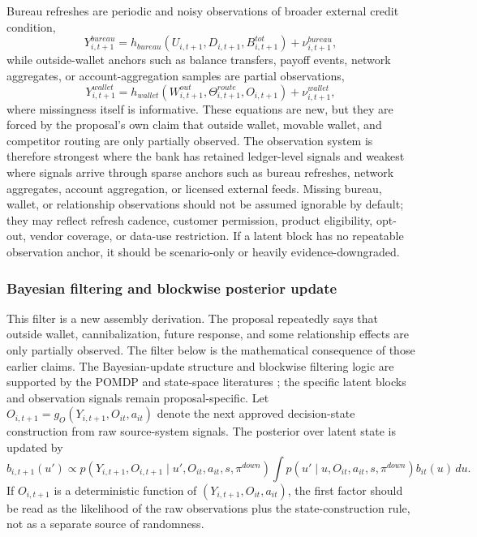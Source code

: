 \documentclass[11pt]{article}
\newcommand{\1}{\mathbf{1}}
\begin{document}
Bureau refreshes are periodic and noisy observations of broader external credit
condition,
\begin{equation}
  Y^{bureau}_{i,t+1}
  =
  h_{bureau}(U_{i,t+1},D_{i,t+1},B^{tot}_{i,t+1}) + \nu^{bureau}_{i,t+1},
  \label{eq:ss-obs-bureau}
\end{equation}
while outside-wallet anchors such as balance transfers, payoff events, network
aggregates, or account-aggregation samples are partial observations,
\begin{equation}
  Y^{wallet}_{i,t+1}
  =
  h_{wallet}(W^{out}_{i,t+1},\Theta^{route}_{i,t+1},O_{i,t+1})
  + \nu^{wallet}_{i,t+1},
  \label{eq:ss-obs-wallet}
\end{equation}
where missingness itself is informative. These equations are new, but they are
forced by the proposal's own claim that outside wallet, movable wallet, and
competitor routing are only partially observed.
The observation system is therefore strongest where the bank has retained
ledger-level signals and weakest where signals arrive through sparse anchors
such as bureau refreshes, network aggregates, account aggregation, or licensed
external feeds. Missing bureau, wallet, or relationship observations should not
be assumed ignorable by default; they may reflect refresh cadence, customer
permission, product eligibility, opt-out, vendor coverage, or data-use
restriction. If a latent block has no repeatable observation anchor, it should
be scenario-only or heavily evidence-downgraded.

\subsubsection{Bayesian filtering and blockwise posterior update}
\label{subsec:state-space-filtering}

This filter is a new assembly derivation. The proposal repeatedly says that
outside wallet, cannibalization, future response, and some relationship effects
are only partially observed. The filter below is the mathematical consequence of
those earlier claims. The Bayesian-update structure and blockwise filtering logic
are supported by the POMDP and state-space literatures
\citep{smallwood1973pomdp,kaelbling1998pomdp,durbinkoopman2012ssm,
westharrison1997bfdm,doucet2001smc}; the specific latent blocks and observation
signals remain proposal-specific. Let $O_{i,t+1}=g_O(Y_{i,t+1},O_{it},a_{it})$
denote the next approved decision-state construction from raw source-system
signals. The posterior over latent state is updated by
\begin{equation}
  b_{i,t+1}(u')
  \propto
  p(Y_{i,t+1},O_{i,t+1}\mid u',O_{it},a_{it},s,\pi^{down})
  \int p(u'\mid u,O_{it},a_{it},s,\pi^{down})b_{it}(u)\,du.
  \label{eq:ss-filter-update}
\end{equation}
If $O_{i,t+1}$ is a deterministic function of $(Y_{i,t+1},O_{it},a_{it})$, the
first factor should be read as the likelihood of the raw observations plus the
state-construction rule, not as a separate source of randomness.
\end{document}
